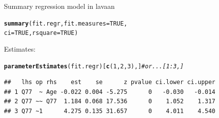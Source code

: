 \documentclass[10pt]{beamer}\usepackage[]{graphicx}\usepackage[]{xcolor}
\makeatletter
\newcommand{\hlnum}[1]{\textcolor[rgb]{0.686,0.059,0.569}{#1}}%
\newcommand{\hlcom}[1]{\textcolor[rgb]{0.678,0.584,0.686}{\textit{#1}}}%
\newcommand{\hlstd}[1]{\textcolor[rgb]{0.345,0.345,0.345}{#1}}%
\newcommand{\hlkwc}[1]{\textcolor[rgb]{0.333,0.667,0.333}{#1}}%
\newcommand{\hlkwd}[1]{\textcolor[rgb]{0.737,0.353,0.396}{\textbf{#1}}}%
\newenvironment{kframe}{%
 \def\at@end@of@kframe{}%
 \ifinner\ifhmode%
  \def\at@end@of@kframe{\end{minipage}}%
  \begin{minipage}{\columnwidth}%
 \fi\fi%
 \def\FrameCommand##1{\hskip\@totalleftmargin \hskip-\fboxsep
 \colorbox{shadecolor}{##1}\hskip-\fboxsep
     \hskip-\linewidth \hskip-\@totalleftmargin \hskip\columnwidth}%
 \MakeFramed {\advance\hsize-\width
   \@totalleftmargin\z@ \linewidth\hsize
   \@setminipage}}%
 {\par\unskip\endMakeFramed%
 \at@end@of@kframe}
\newenvironment{knitrout}{}{} %
\makeatother
\begin{document}
\begin{frame}[fragile]{Summary regression model in lavaan}

\begin{knitrout}
\color{fgcolor}\begin{kframe}
\begin{alltt}
\hlkwd{summary}\hlstd{(fit.regr,} \hlkwc{fit.measures} \hlstd{=} \hlnum{TRUE}\hlstd{,}
        \hlkwc{ci} \hlstd{=} \hlnum{TRUE}\hlstd{,} \hlkwc{rsquare} \hlstd{=} \hlnum{TRUE}\hlstd{)}
\end{alltt}
\end{kframe}
\end{knitrout}

\vspace{5mm}

Estimates: 
\begin{knitrout}
\color{fgcolor}\begin{kframe}
\begin{alltt}
\hlkwd{parameterEstimates}\hlstd{(fit.regr)[}\hlkwd{c}\hlstd{(}\hlnum{1}\hlstd{,}\hlnum{2}\hlstd{,}\hlnum{3}\hlstd{),]} \hlcom{# or ...[1:3,]}
\end{alltt}
\begin{verbatim}
##   lhs op rhs    est    se      z pvalue ci.lower ci.upper
## 1 Q77  ~ Age -0.022 0.004 -5.275      0   -0.030   -0.014
## 2 Q77 ~~ Q77  1.184 0.068 17.536      0    1.052    1.317
## 3 Q77 ~1      4.275 0.135 31.657      0    4.011    4.540
\end{verbatim}
\end{kframe}
\end{knitrout}
\end{frame}
%
\end{document}
